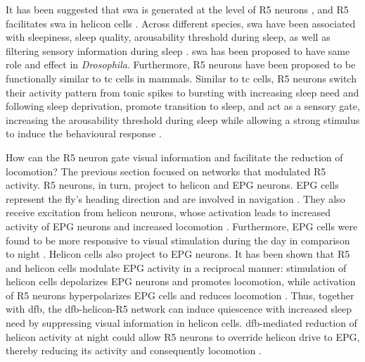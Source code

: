 \documentclass[../main.tex]{subfiles}
\begin{document}
It has been suggested that \gls{swa} is generated at the level of R5 neurons \cite{raccugliaNetworkSpecificSynchronizationElectrical2019}, and R5 facilitates \gls{swa} in helicon cells \cite{raccugliaCoherentMultilevelNetwork2022}. Across different species, \gls{swa} have been associated with sleepiness, sleep quality, arousability threshold during sleep, as well as filtering sensory information during sleep \cite{suarez-grimaltNeuralArchitectureSleep2021,raccugliaNetworkSpecificSynchronizationElectrical2019,raccugliaCoherentMultilevelNetwork2022}.
\gls{swa} has been proposed to have same role and effect in \textit{Drosophila}. Furthermore, R5 neurons have been proposed to be functionally similar to \gls{tc} cells in mammals. Similar to \gls{tc} cells, R5 neurons switch their activity pattern from tonic spikes to bursting  with increasing sleep need and following sleep deprivation, promote transition to sleep, and act as a sensory gate, increasing the arousability threshold during sleep while allowing a strong stimulus to induce the behavioural response
\cite{
    suarez-grimaltNeuralArchitectureSleep2021,
    raccugliaNetworkSpecificSynchronizationElectrical2019,
    raccugliaCoherentMultilevelNetwork2022,
    yanSubtypeSpecificRolesEllipsoid2023,
    gentThalamicDualControl2018}.

How can the R5 neuron gate visual information and facilitate the reduction of locomotion? The previous section focused on networks that modulated R5 activity. R5 neurons, in turn, project to helicon and EPG neurons. EPG cells represent the fly's heading direction and are involved in navigation \cite{raccugliaCoherentMultilevelNetwork2022}. They also receive excitation from helicon neurons, whose activation leads to increased activity of EPG neurons and increased locomotion \cite{raccugliaCoherentMultilevelNetwork2022}.
Furthermore, EPG cells were found to be more responsive to visual stimulation during the day in comparison to night \cite{raccugliaCoherentMultilevelNetwork2022}.
Helicon cells also project to EPG neurons. It has been shown that R5 and helicon cells modulate EPG activity in a reciprocal manner: stimulation of helicon cells depolarizes EPG neurons and promotes locomotion, while activation of R5 neurons hyperpolarizes EPG cells and reduces locomotion \cite{raccugliaCoherentMultilevelNetwork2022}. Thus, together with \gls{dfb}, the \gls{dfb}-helicon-R5 network can induce quiescence with increased sleep need by suppressing visual information in helicon cells.
\gls{dfb}-mediated reduction of helicon activity at night could allow R5 neurons to override helicon drive to EPG, thereby reducing its activity and consequently locomotion \cite{raccugliaCoherentMultilevelNetwork2022}.
\end{document}

